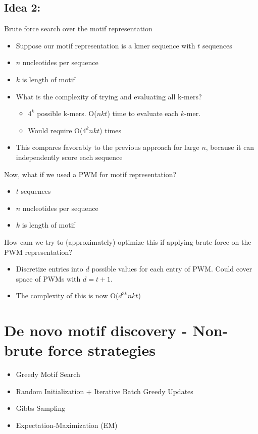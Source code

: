 \documentclass[10pt]{article}
\begin{document}
\subsection*{Idea 2:}
Brute force search over the motif representation
\begin{itemize}
	\item Suppose our motif representation is a kmer sequence with $t$ sequences
	\item $n$ nucleotides per sequence
	\item $k$ is length of motif
	\item What is the complexity of trying and evaluating all k-mers?
	\begin{itemize}
        \item $4^k$ possible k-mers.  O($nkt$) time to evaluate each $k$-mer.
        \item Would require O($4^k nkt$) times
    \end{itemize}
    \item This compares favorably to the previous approach for large $n$, because it can independently score each sequence
\end{itemize}
Now, what if we used a PWM for motif representation?
\begin{itemize}
	\item $t$ sequences
    \item $n$ nucleotides per sequence
	\item $k$ is length of motif
\end{itemize}
How cam we try to (approximately) optimize this if applying brute force on the PWM representation?
\begin{itemize}
    \item Discretize entries into $d$ possible values for each entry of PWM.  Could cover space of PWMs with $d = t + 1$.
    \item The complexity of this is now O($d^{3k} nkt$)
\end{itemize}

\section*{De novo motif discovery - Non-brute force strategies}
\begin{itemize}
	\item Greedy Motif Search
	\item Random Initialization + Iterative Batch Greedy Updates
	\item Gibbs Sampling
	\item Expectation-Maximization (EM)
\end{itemize}
\end{document}
